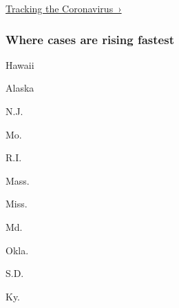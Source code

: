 \href{https://www.nytimes.com/interactive/2020/us/coronavirus-us-cases.html}{Tracking
the Coronavirus~›}

\href{https://www.nytimes.com/interactive/2020/us/coronavirus-us-cases.html}{}

\hypertarget{where-cases-are-rising-fastest}{%
\subsubsection{\texorpdfstring{Where cases are \textbf{rising}
fastest}{Where cases are rising fastest}}\label{where-cases-are-rising-fastest}}

\href{https://www.nytimes.com/interactive/2020/us/hawaii-coronavirus-cases.html}{}

Hawaii

\href{https://www.nytimes.com/interactive/2020/us/alaska-coronavirus-cases.html}{}

Alaska

\href{https://www.nytimes.com/interactive/2020/us/new-jersey-coronavirus-cases.html}{}

N.J.

\href{https://www.nytimes.com/interactive/2020/us/missouri-coronavirus-cases.html}{}

Mo.

\href{https://www.nytimes.com/interactive/2020/us/rhode-island-coronavirus-cases.html}{}

R.I.

\href{https://www.nytimes.com/interactive/2020/us/massachusetts-coronavirus-cases.html}{}

Mass.

\href{https://www.nytimes.com/interactive/2020/us/mississippi-coronavirus-cases.html}{}

Miss.

\href{https://www.nytimes.com/interactive/2020/us/maryland-coronavirus-cases.html}{}

Md.

\href{https://www.nytimes.com/interactive/2020/us/oklahoma-coronavirus-cases.html}{}

Okla.

\href{https://www.nytimes.com/interactive/2020/us/south-dakota-coronavirus-cases.html}{}

S.D.

\href{https://www.nytimes.com/interactive/2020/us/kentucky-coronavirus-cases.html}{}

Ky.

\href{https://www.nytimes.com/interactive/2020/us/nebraska-coronavirus-cases.html}{}

